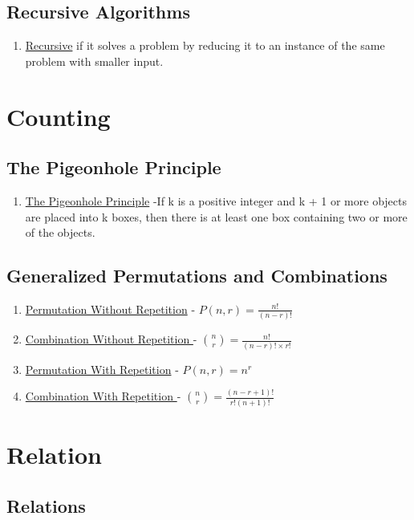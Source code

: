 \documentclass[12pt]{article}
\begin{document}
\subsection{Recursive Algorithms}
\begin{enumerate}
\item \underline{Recursive} if it solves a problem by reducing it to an instance of the same problem with smaller input.
\end{enumerate}



\section{Counting}
\subsection{The Pigeonhole Principle}
\begin{enumerate}
\item \underline{The Pigeonhole Principle} -If k is a positive integer and k + 1 or more objects are placed into k boxes, then there is at least one box containing two or more of the objects.
\end{enumerate}

\subsection{Generalized Permutations and Combinations}

\begin{enumerate}
\item \underline{Permutation Without Repetition} - $P( n, r ) = \frac{n!}{(n-r)!}$
\item \underline{Combination Without Repetition } - ${ n \choose r } = \frac{n!}{(n - r)! \times r!}$
\item \underline{Permutation With Repetition} - $P( n, r ) = n^{r}$
\item \underline{Combination With Repetition } - ${ n \choose r } = \frac{(n -r + 1)!}{r!(n + 1)!}$
\end{enumerate}

\section{Relation}
\subsection{Relations}
\end{document}
